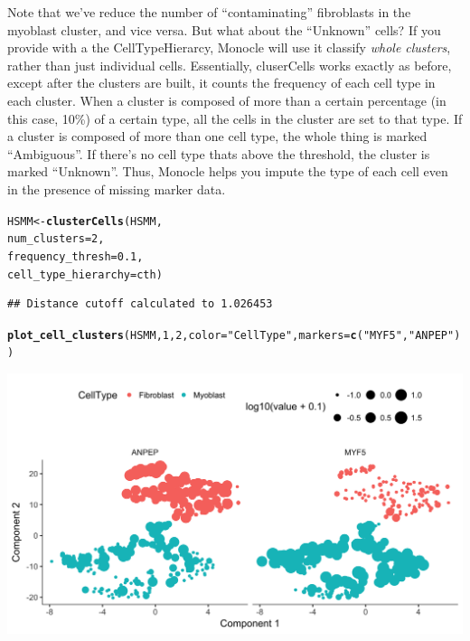 \documentclass[10pt,oneside]{article}\usepackage[]{graphicx}\usepackage[]{color}
\makeatletter
\def\maxwidth{ %
  \ifdim\Gin@nat@width>\linewidth
    \linewidth
  \else
    \Gin@nat@width
  \fi
}
\newcommand{\hlnum}[1]{\textcolor[rgb]{0.686,0.059,0.569}{#1}}%
\newcommand{\hlstr}[1]{\textcolor[rgb]{0.192,0.494,0.8}{#1}}%
\newcommand{\hlstd}[1]{\textcolor[rgb]{0.345,0.345,0.345}{#1}}%
\newcommand{\hlkwb}[1]{\textcolor[rgb]{0.69,0.353,0.396}{#1}}%
\newcommand{\hlkwc}[1]{\textcolor[rgb]{0.333,0.667,0.333}{#1}}%
\newcommand{\hlkwd}[1]{\textcolor[rgb]{0.737,0.353,0.396}{\textbf{#1}}}%
\newenvironment{kframe}{%
 \def\at@end@of@kframe{}%
 \ifinner\ifhmode%
  \def\at@end@of@kframe{\end{minipage}}%
  \begin{minipage}{\columnwidth}%
 \fi\fi%
 \def\FrameCommand##1{\hskip\@totalleftmargin \hskip-\fboxsep
 \colorbox{shadecolor}{##1}\hskip-\fboxsep
     \hskip-\linewidth \hskip-\@totalleftmargin \hskip\columnwidth}%
 \MakeFramed {\advance\hsize-\width
   \@totalleftmargin\z@ \linewidth\hsize
   \@setminipage}}%
 {\par\unskip\endMakeFramed%
 \at@end@of@kframe}
\newenvironment{knitrout}{}{} %
\makeatother
\begin{document}
 Note that we've reduce the number of ``contaminating'' fibroblasts in the myoblast cluster, and vice versa. But what about the ``Unknown'' cells? If you provide  with a the CellTypeHierarcy, Monocle will use it classify \emph{whole clusters}, rather than just individual cells. Essentially, cluserCells works exactly as before, except after the clusters are built, it counts the frequency of each cell type in each cluster. When a cluster is composed of more than a certain percentage (in this case, 10\%) of a certain type, all the cells in the cluster are set to that type. If a cluster is composed of more than one cell type, the whole thing is marked ``Ambiguous''. If there's no cell type thats above the threshold, the cluster is marked ``Unknown''. Thus, Monocle helps you impute the type of each cell even in the presence of missing marker data.
 
\begin{knitrout}
\color{fgcolor}\begin{kframe}
\begin{alltt}
\hlstd{HSMM} \hlkwb{<-} \hlkwd{clusterCells}\hlstd{(HSMM,}
                     \hlkwc{num_clusters}\hlstd{=}\hlnum{2}\hlstd{,}
                     \hlkwc{frequency_thresh}\hlstd{=}\hlnum{0.1}\hlstd{,}
                     \hlkwc{cell_type_hierarchy}\hlstd{=cth)}
\end{alltt}
\begin{verbatim}
## Distance cutoff calculated to 1.026453
\end{verbatim}


{\ttfamily\noindent\itshape\color{messagecolor}{\#\# the length of the distance: 34191}}\begin{alltt}
\hlkwd{plot_cell_clusters}\hlstd{(HSMM,} \hlnum{1}\hlstd{,} \hlnum{2}\hlstd{,} \hlkwc{color}\hlstd{=}\hlstr{"CellType"}\hlstd{,} \hlkwc{markers} \hlstd{=} \hlkwd{c}\hlstd{(}\hlstr{"MYF5"}\hlstd{,} \hlstr{"ANPEP"}\hlstd{))}
\end{alltt}
\end{kframe}

{\centering \includegraphics[width=\maxwidth]{figure/cluster_cells_semisup_clustering_with_impute-1} 

}



\end{knitrout}
 
\end{document}
